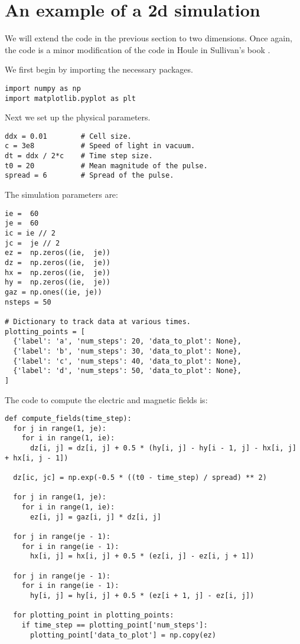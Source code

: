 \documentclass[11pt]{article}
\numberwithin{equation}{section}
\begin{document}
\section{An example of a 2d simulation}\label{s8}
We will extend the code in the previous section to two dimensions. Once again,
the code is a minor modification of the code in Houle in Sullivan's book
\cite{sullivan2013electromagnetic}.

We first begin by importing the necessary packages.
\begin{verbatim}
import numpy as np
import matplotlib.pyplot as plt
\end{verbatim}

Next we set up the physical parameters.
\begin{verbatim}
ddx = 0.01        # Cell size.
c = 3e8           # Speed of light in vacuum.
dt = ddx / 2*c    # Time step size.
t0 = 20           # Mean magnitude of the pulse.
spread = 6        # Spread of the pulse.
\end{verbatim}

The simulation parameters are:
\begin{verbatim}
ie =  60
je =  60
ic = ie // 2
jc =  je // 2
ez =  np.zeros((ie,  je))
dz =  np.zeros((ie,  je))
hx =  np.zeros((ie,  je))
hy =  np.zeros((ie,  je))
gaz = np.ones((ie, je))
nsteps = 50

# Dictionary to track data at various times.
plotting_points = [
  {'label': 'a', 'num_steps': 20, 'data_to_plot': None},
  {'label': 'b', 'num_steps': 30, 'data_to_plot': None},
  {'label': 'c', 'num_steps': 40, 'data_to_plot': None},
  {'label': 'd', 'num_steps': 50, 'data_to_plot': None},
]
\end{verbatim}

The code to compute the electric and magnetic fields is:
\begin{verbatim}
def compute_fields(time_step):
  for j in range(1, je):
    for i in range(1, ie):
      dz[i, j] = dz[i, j] + 0.5 * (hy[i, j] - hy[i - 1, j] - hx[i, j] + hx[i, j - 1])

  dz[ic, jc] = np.exp(-0.5 * ((t0 - time_step) / spread) ** 2)

  for j in range(1, je):
    for i in range(1, ie):
      ez[i, j] = gaz[i, j] * dz[i, j]

  for j in range(je - 1):
    for i in range(ie - 1):
      hx[i, j] = hx[i, j] + 0.5 * (ez[i, j] - ez[i, j + 1])

  for j in range(je - 1):
    for i in range(ie - 1):
      hy[i, j] = hy[i, j] + 0.5 * (ez[i + 1, j] - ez[i, j])

  for plotting_point in plotting_points:
    if time_step == plotting_point['num_steps']:
      plotting_point['data_to_plot'] = np.copy(ez)
\end{verbatim}
\end{document}
